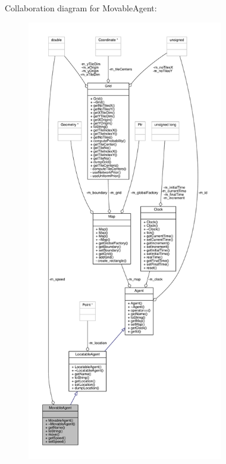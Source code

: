 Collaboration diagram for Movable\+Agent\+:
\nopagebreak
\begin{figure}[H]
\begin{center}
\leavevmode
\includegraphics[height=550pt]{class_movable_agent__coll__graph}
\end{center}
\end{figure}
